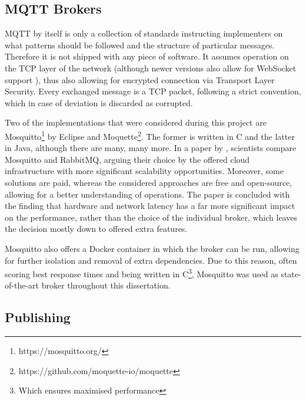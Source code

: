 \subsection{MQTT Brokers}
MQTT by itself is only a collection of standards instructing implementers on what patterns should be followed and the structure of particular messages. Therefore it is not shipped with any piece of software. It assumes operation on the TCP layer of the network (although newer versions also allow for WebSocket support \citep{mijovic2016comparing}), thus also allowing for encrypted connection via Transport Layer Security. Every exchanged message is a TCP packet, following a strict convention, which in case of deviation is discarded as corrupted.

Two of the implementations that were considered during this project are Mosquitto\footnote{https://mosquitto.org/} by Eclipse and Moquette\footnote{https://github.com/moquette-io/moquette}. The former is written in C and the latter in Java, although there are many, many more. In a paper by \citet{de2019performance}, scientists compare Mosquitto and RabbitMQ, arguing their choice by the offered cloud infrastructure with more significant scalability opportunities. Moreover, some solutions are paid, whereas the considered approaches are free and open-source, allowing for a better understanding of operations. The paper is concluded with the finding that hardware and network latency has a far more significant impact on the performance, rather than the choice of the individual broker, which leaves the decision mostly down to offered extra features.

Mosquitto also offers a Docker container \cite{light2017mosquitto} in which the broker can be run, allowing for further isolation and removal of extra dependencies. Due to this reason, often scoring best response times and being written in C\footnote{Which ensures maximised performance}, Mosquitto was used as state-of-the-art broker throughout this dissertation.

\subsection{Publishing}\label{sec:pub}


